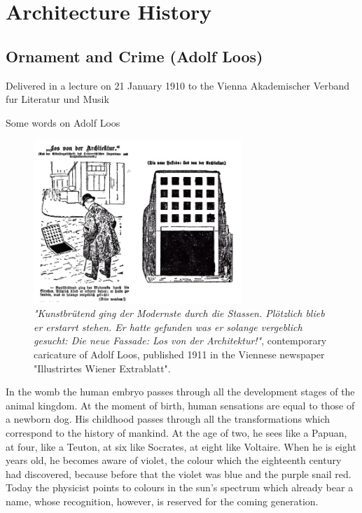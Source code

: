 \documentclass[a4paper]{article}
\begin{document}
\clearpage
\section{Architecture History}

\subsection{Ornament and Crime (Adolf Loos)}

Delivered in a lecture on 21 January 1910 to the Vienna Akademischer Verband fur Literatur und Musik

Some words on Adolf Loos

\begin{figure}[h]
  \centering
  \includegraphics[width=0.7\textwidth]{./figures/caricature_loos.jpg}
  \caption{\textit{"Kunstbrütend ging der Modernste durch die Stassen. Plötzlich blieb er erstarrt stehen. Er hatte gefunden was er solange vergeblich gesucht: Die neue Fassade: Los von der Architektur!"}, contemporary caricature of Adolf Loos, published 1911 in the Viennese newspaper "Illustrirtes Wiener Extrablatt".}
  \label{fig:caricature_loos}
\end{figure}


In the womb the human embryo passes through all the development stages of the animal kingdom. At the moment of birth, human sensations are equal to those of a newborn dog. His childhood passes through all the transformations which correspond to the history of mankind. At the age of two, he sees like a Papuan, at four, like a Teuton, at six like Socrates, at eight like Voltaire. When he is eight years old, he becomes aware of violet, the colour which the eighteenth century had discovered, because before that the violet was blue and the purple snail red. Today the physicist points to colours in the sun’s spectrum which already bear a name, whose recognition, however, is reserved for the coming generation.
\end{document}
